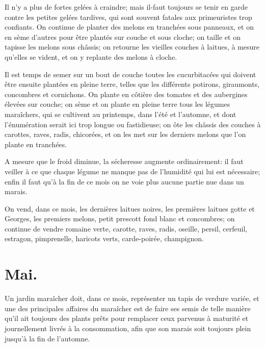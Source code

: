 \documentclass[10pt,a4paper]{book}
\begin{document}
Il n’y a plus de fortes gelées à craindre; mais il-faut toujours se tenir en garde contre les petites gelées tardives, qui sont souvent fatales aux primeuristes trop confiants. On continue de planter des melons en tranchées sous panneaux, et on en sème d'autres pour être plantés sur couche et sous cloche; on taille et on tapisse les melons sous châssis; on retourne les vieilles couches à laitues, à mesure qu'elles se vident, et on y replante des melons à cloche.

Il est temps de semer sur un bout de couche toutes les cucurbitacées qui doivent être ensuite plantées en pleine terre, telles que les différents potirons, giraumonts, concombres et cornichons. On plante en côtière des tomates et des aubergines élevées sur couche; on sème et on plante en pleine terre tous les légumes maraîchers, qui se cultivent au printemps, dans l'été et l'automne, et dont l'énumération serait ici trop longue ou fastidieuse; on ôte les châssis des couches à carottes, raves, radis, chicorées, et on les met sur les derniers melons que l'on plante en tranchées.

A mesure que le froid diminue, la sécheresse augmente ordinairement: il faut veiller à ce que chaque légume ne manque pas de l'humidité qui lui est nécessaire; enfin il faut qu'à la fin de ce mois on ne voie plus aucune partie nue dans un marais.

On vend, dans ce mois, les dernières laitues noires, les premières laitues gotte et Georges, les premiers melons, petit prescott fond blanc et concombres; on continue de vendre romaine verte, carotte, raves, radis, oseille, persil, cerfeuil, estragon, pimprenelle, haricots verts, carde-poirée, champignon.

\section{Mai.}

Un jardin maraîcher doit, dans ce mois, représenter un tapis de verdure variée, et une des principales affaires du maraîcher est de faire ses semis de telle manière qu'il ait toujours des plants prêts pour remplacer ceux parvenus à maturité et journellement livrés à la consommation, afin que son marais soit toujours plein jusqu'à la fin de l'automne.
\end{document}
